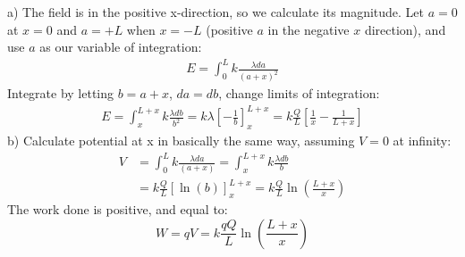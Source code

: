 \begin{solution}
a) The field is in the positive x-direction, so we calculate its magnitude. Let $a=0$ at $x=0$ and $a=+L$ when $x=-L$ (positive $a$ in the negative $x$ direction), and use $a$ as our variable of integration:
\begin{align*}
E = \int_{0}^{L}k\frac{\lambda da}{(a+x)^2}
\end{align*}
Integrate by letting $b=a+x$, $da=db$, change limits of integration:
\begin{align*}
E = \int_{x}^{L+x}k\frac{\lambda db}{b^2}=k\lambda \left[-\frac{1}{b}\right]_{x}^{L+x}=k\frac{Q}{L}\left[\frac{1}{x}-\frac{1}{L+x}\right]
\end{align*}
b) Calculate potential at x in basically the same way, assuming $V=0$ at infinity:
\begin{align*}
V &= \int_{0}^{L}k\frac{\lambda da}{(a+x)} = \int_{x}^{L+x}k\frac{\lambda db}{b}\\
&=k\frac{Q}{L}\left[\ln(b)\right]_{x}^{L+x}=k\frac{Q}{L}\ln\left( \frac{L+x}{x} \right)
\end{align*}
The work done is positive, and equal to:
\begin{equation*}
W=qV=k\frac{qQ}{L}\ln\left( \frac{L+x}{x} \right)
\end{equation*}

\end{solution}

